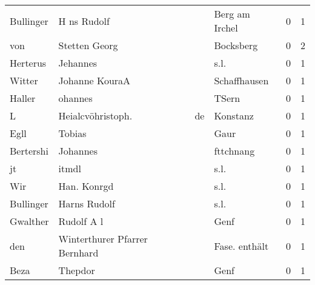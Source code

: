 \begin{tabular}{llllrr}
                Bullinger &                        H ns Rudolf &             &                              Berg am Irchel &          0 &         1 \\
                      von &                      Stetten Georg &             &                                   Bocksberg &          0 &         2 \\
                 Herterus &                           Jehannes &             &                                        s.l. &          0 &         1 \\
                   Witter &                     Johanne KouraA &             &                                Schaffhausen &          0 &         1 \\
                   Haller &                            ohannes &             &                                       TSern &          0 &         1 \\
                        L &                  Heialcvöhristoph. &          de &                                    Konstanz &          0 &         1 \\
                     Egll &                             Tobias &             &                                        Gaur &          0 &         1 \\
                Bertershi &                           Johannes &             &                                   fttchnang &          0 &         1 \\
                       jt &                              itmdl &             &                                        s.l. &          0 &         1 \\
                      Wir &                        Han. Konrgd &             &                                        s.l. &          0 &         1 \\
                Bullinger &                       Harns Rudolf &             &                                        s.l. &          0 &         1 \\
                 Gwalther &                         Rudolf A l &             &                                        Genf &          0 &         1 \\
                      den &      Winterthurer Pfarrer Bernhard &             &                               Fase. enthält &          0 &         1 \\
                     Beza &                            Thepdor &             &                                        Genf &          0 &         1 \\

\end{tabular}
